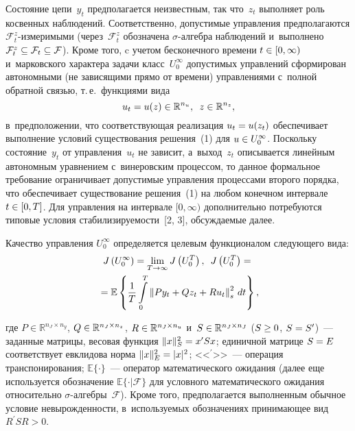 \begin{multicols}{2}
     Состояние цепи~$y_t$ предполагается неизвестным, так что~$z_t$ 
выполняет роль косвенных наблюдений. Соответственно, допустимые 
управления предполагаются $\mathcal{F}_t^z$-из\-ме\-ри\-мы\-ми 
(через~$\mathcal{F}_t^z$ обозначена $\sigma$-ал\-геб\-ра наблюдений и~выполнено 
$\mathcal{F}_t^z\hm\subseteq \mathcal{F}_t \hm\subseteq \mathcal{F}$). Кроме 
того, c учетом бесконечного времени $t\hm\in[0,\infty)$ и~марковского 
характера задачи класс~$U_0^\infty$ допустимых управлений сформирован 
автономными (не зависящими прямо от времени) управлениями с~полной 
обратной связью, т.\,е.\ функциями вида 
$$
u_t= u(z)\in  \mathbb{R}^{n_u},\enskip z\in \mathbb{R}^{n_z},
$$ в~предположении, что 
соответствующая реализация $u_t\hm= u(z_t)$ обеспечивает выполнение 
условий существования решения~(1) для $u\hm\in U_0^\infty$. Поскольку 
состояние~$y_t$ от управ\-ле\-ния~$u_t$ не зависит, а~выход~$z_t$ 
описывается линейным автономным уравнением с~винеровским процессом, 
то данное формальное требование ограничивает допустимые управления 
процессами второго порядка, что обеспечивает существование решения~(1) 
на любом конечном интервале $t\hm\in [0,T]$. Для управления на интервале 
$[0,\infty)$ дополнительно потребуются типовые условия 
стабилизируемости~[2, 3], обсуждаемые далее.
     
     Качество управления $U_0^\infty$ определяется целевым 
функционалом сле\-ду\-юще\-го вида:
     \begin{multline}
          J\left(U_0^\infty\right) =\lim\limits_{T\to\infty} J\left(U_0^T\right),\enskip
              J\left(U_0^T\right)= {}\\
              {}= \mathbb{E}\left\{ \displaystyle\frac{\displaystyle 1\mathstrut}{\displaystyle T\mathstrut} \int\limits_0^T \left\| Py_t+Qz_t+R 
u_t\right\|_s^2\,dt\right\},
 \label{e2-bos}
 \end{multline}

\vspace*{-4pt}

\noindent
где $P\in \mathbb{R}^{n_J\times n_y}$, $Q\hm\in \mathbb{R}^{n_J\times 
n_z}$, $R\hm\in \mathbb{R}^{n_J\times n_u}$ и~$S\hm\in 
\mathbb{R}^{n_J\times n_J}$ ($S\hm\geq 0$, $S\hm= S^\prime$)~--- заданные 
матрицы, весовая функция $\| x\|_S^2\hm= x^\prime Sx$; единичной матрице 
$S\hm=E$ соответствует евклидова норма $\| x\|^2_E\hm= \vert x\vert^2$; 
<<${}^\prime$>>~--- операция транспонирования; $\mathbb{E}\{\cdot\}$~--- 
оператор математического ожидания (далее еще используется обозначение 
$\mathbb{E}\{\cdot\vert\mathcal{F}\}$ для условного математического 
ожидания относительно $\sigma$-ал\-геб\-ры~$\mathcal{F}$). Кроме того, 
предполагается выполненным обычное условие невырожденности, 
в~используемых обозначениях принимающее вид $R^\prime SR>0$.


\end{multicols}
